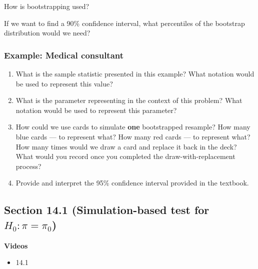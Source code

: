 \documentclass[
]{report}
\providecommand{\tightlist}{%
  \setlength{\itemsep}{0pt}\setlength{\parskip}{0pt}}
\newcommand{\rgs}{\vspace{12pt}} %
\begin{document}
How is bootstrapping used?\\
\rgs

If we want to find a 90\% confidence interval, what percentiles of the bootstrap distribution would we need?\\
\rgs

\hypertarget{example-medical-consultant}{%
\subsubsection*{Example: Medical consultant}\label{example-medical-consultant}}

\begin{enumerate}
\def\labelenumi{\arabic{enumi}.}
\item
  What is the sample statistic presented in this example? What notation would be used to represent this value?
  \rgs
\item
  What is the parameter representing in the context of this problem? What notation would be used to represent this parameter?
  \rgs
  \rgs
\item
  How could we use cards to simulate \textbf{one} bootstrapped resample? How many blue cards --- to represent what? How many red cards --- to represent what? How many times would we draw a card and replace it back in the deck? What would you record once you completed the draw-with-replacement process?
  \rgs
  \rgs
  \rgs
\item
  Provide and interpret the 95\% confidence interval provided in the textbook.
  \rgs
  \rgs
\end{enumerate}

\hypertarget{section-14.1-simulation-based-test-for-h_0pi-pi_0}{%
\subsection*{\texorpdfstring{Section 14.1 (Simulation-based test for \(H_0:\pi = \pi_0\))}{Section 14.1 (Simulation-based test for H\_0:\textbackslash pi = \textbackslash pi\_0)}}\label{section-14.1-simulation-based-test-for-h_0pi-pi_0}}


\textbf{Videos}

\begin{itemize}
\tightlist
\item
  14.1
\end{itemize}
\end{document}
